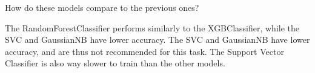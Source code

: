 \documentclass{usireport}
\begin{document}
How do these models compare to the previous ones?

The RandomForestClassifier performs similarly to the XGBClassifier, while the SVC and GaussianNB have lower accuracy. The SVC and GaussianNB have lower accuracy, and are thus not recommended for this task. The Support Vector Classifier is also way slower to train than the other models.
\end{document}
